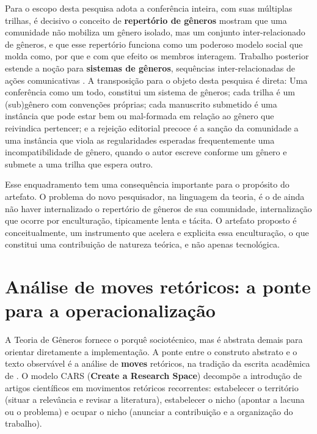 Para o escopo desta pesquisa adota a conferência inteira, com suas múltiplas trilhas, é decisivo o conceito de \textbf{repertório de gêneros} \cite{GenreRepertoire}  mostram que uma comunidade não mobiliza um gênero isolado, mas um conjunto inter-relacionado de gêneros, e que esse repertório funciona como um poderoso modelo social que molda como, por que e com que efeito os membros interagem. Trabalho posterior estende a noção para \textbf{sistemas de gêneros}, sequências inter-relacionadas de ações comunicativas \cite{GenreSystems}. A transposição para o objeto desta pesquisa é direta: Uma conferência como um todo, constitui um sistema de gêneros; cada trilha é um (sub)gênero com convenções próprias; cada manuscrito submetido é uma instância que pode estar bem ou mal-formada em relação ao gênero que reivindica pertencer; e a rejeição editorial precoce é a sanção da comunidade a uma instância que viola as regularidades esperadas frequentemente uma incompatibilidade de gênero, quando o autor escreve conforme um gênero e submete a uma trilha que espera outro.

Esse enquadramento tem uma consequência importante para o propósito do artefato. O problema do novo pesquisador, na linguagem da teoria, é o de ainda não haver internalizado o repertório de gêneros de sua comunidade, internalização que ocorre por enculturação, tipicamente lenta e tácita. O artefato proposto é conceitualmente, um instrumento que acelera e explicita essa enculturação, o que constitui uma contribuição de natureza teórica, e não apenas tecnológica.



\section{Análise de \textbf{moves} retóricos: a ponte para a operacionalização}

A Teoria de Gêneros fornece o porquê sociotécnico, mas é abstrata demais para orientar diretamente a implementação. A ponte entre o construto abstrato e o texto observável é a análise de \textbf{moves} retóricos, na tradição da escrita acadêmica de \cite{GenreAnalysis}. O modelo CARS (\textbf{Create a Research Space}) decompõe a introdução de artigos científicos em movimentos retóricos recorrentes: estabelecer o território (situar a relevância e revisar a literatura), estabelecer o nicho (apontar a lacuna ou o problema) e ocupar o nicho (anunciar a contribuição e a organização do trabalho).


